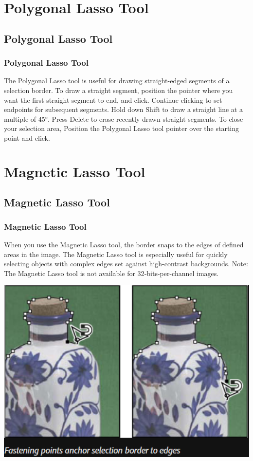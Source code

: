 \documentclass{beamer}
\begin{document}
\section{Polygonal Lasso Tool}	
\subsection{Polygonal Lasso Tool}		
\begin{frame}
	\frametitle{Polygonal Lasso Tool}
	\begin{outline}
		\1 The Polygonal Lasso tool is useful for drawing straight-edged segments of a selection border.
		\1 To draw a straight segment, position the pointer where you want the first straight segment to end, and click. Continue clicking to set endpoints for subsequent segments.
		\1 Hold down Shift to draw a straight line at a multiple of 45°.
		\1 Press Delete to erase recently drawn straight segments.
		\1 To close your selection area, Position the Polygonal Lasso tool pointer over the starting point and click.
	\end{outline}
\end{frame}


\section{Magnetic Lasso Tool}	
\subsection{Magnetic Lasso Tool}		
\begin{frame}
	\frametitle{Magnetic Lasso Tool}
	\begin{outline}
		\1 When you use the Magnetic Lasso tool, the border snaps to the edges of defined areas in the image. 
		\1 The Magnetic Lasso tool is especially useful for quickly selecting objects with complex edges set against high-contrast backgrounds.
		\1 Note: The Magnetic Lasso tool is not available for 32‑bits-per-channel images.
	\end{outline}
	\begin{center}
	\includegraphics[width = 1.0\textwidth]{images/Magnetic Lasso1.png}
\end{center}
\end{frame}
\end{document}
